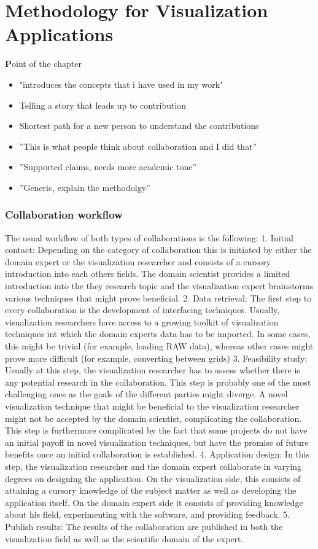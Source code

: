 \chapter{Methodology for Visualization Applications}
\label{cha:visapp}

{\textbf Point of the chapter}
\begin{itemize}
\item "introduces the concepts that i have used in my work"
\item Telling a story that leads up to contribution 
\item Shortest path for a new person to understand the contributions
\item ''This is what people think about collaboration and I did that''
\item ''Supported claims, needs more academic tone''
\item ''Generic, explain the methodolgy''
\end{itemize}



\subsection*{Collaboration workflow}
The usual workflow of both types of collaborations is the following:
1. Initial contact: Depending on the category of collaboration this is initiated by either the domain expert or the visualization researcher and consists of a cursory introduction into each others fields. The domain scientist provides a limited introduction into the they research topic and the visualization expert brainstorms various techniques that might prove beneficial.
2. Data retrieval: The first step to every collaboration is the development of interfacing techniques. Usually, visualization researchers have access to a growing toolkit of visualization techniques int which the domain experts data has to be imported. In some cases, this might be trivial (for example, loading RAW data), whereas other cases might prove more difficult (for example, converting between grids)
3. Feasibility study: Usually at this step, the visualization researcher has to assess whether there is any potential research in the collaboration. This step is probably one of the most challenging ones as the goals of the different parties might diverge. A novel visualization technique that might be beneficial to the visualization researcher might not be accepted by the domain scientist, complicating the collaboration. This step is furthermore complicated by the fact that some projects do not have an initial payoff in novel visualization techniques, but have the promise of future benefits once an initial collaboration is established. 
4. Application design: In this step, the visualization researcher and the domain expert collaborate in varying degrees on designing the application. On the visualization side, this consists of attaining a cursory knowledge of the subject matter as well as developing the application itself. On the domain expert side it consists of providing knowledge about his field, experimenting with the software, and providing feedback.
5. Publish results: The results of the collaboration are published in both the visualization field as well as the scientific domain of the expert.

